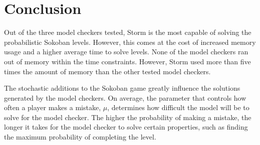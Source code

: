 \section{Conclusion}
Out of the three model checkers tested, Storm is the most capable of solving the probabilistic Sokoban levels. However, this comes at the cost of increased memory usage and a higher average time to solve levels. None of the model checkers ran out of memory within the time constraints. However, Storm used more than five times the amount of memory than the other tested model checkers.

The stochastic additions to the Sokoban game greatly influence the solutions generated by the model checkers. On average, the parameter that controls how often a player makes a mistake, $\mu$, determines how difficult the model will be to solve for the model checker. The higher the probability of making a mistake, the longer it takes for the model checker to solve certain properties, such as finding the maximum probability of completing the level.
